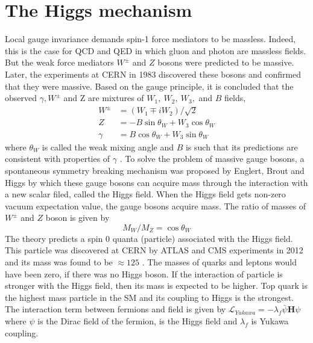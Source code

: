 \section{The Higgs mechanism}\label{sec:higgsMech}
Local gauge invariance demands spin-1 force mediators to be massless. Indeed, this is the case for QCD and QED in which gluon and photon 
are massless fields. But the weak force mediators $W^\pm$ and $Z$ bosons were predicted to be massive. Later, the experiments at CERN in 1983 
\cite{ARNISON1983103}\cite{BANNER1983476}\cite{1983398}\cite{BAGNAIA1983130} discovered these bosons and confirmed that they were massive. 
Based on the gauge principle, it is concluded that the observed $\gamma, W^\pm$ and Z are mixtures of $W_1,\ W_2,\ W_3,$ and $B$ fields,
\begin{align}
W^\pm & = (W_1 \mp iW_2)/\sqrt{2}\\
Z & = -B\sin\theta_W + W_3\cos\theta_W\\
\gamma &= B\cos\theta_W + W_3\sin\theta_W
\end{align}
where $\theta_W$ is called the weak mixing angle and $B$ is such that its predictions are consistent with properties of $\gamma$ 
\cite{MartinShaw}. To solve the problem of massive gauge bosons, a spontaneous symmetry breaking mechanism was proposed by Englert, Brout 
and Higgs \cite{Higgs:1964pj}\cite{Englert:1964et} by which these gauge bosons can acquire mass through the interaction with a new scalar 
filed, called the Higgs field. When the Higgs field gets non-zero vacuum expectation value, the gauge bosons acquire mass.
The ratio of masses of $W^\pm$ and $Z$ boson is given by
\begin{equation}
M_W/M_Z = \cos \theta_W
\end{equation}
The theory predicts a spin 0 quanta (particle) associated with the Higgs field. This particle was discovered at CERN by ATLAS and CMS 
experiments in 2012 \cite{Aad:2012tfa}\cite{Chatrchyan:2012xdj} and its mass was found to be $\approx 125$ \gev. The masses of quarks and 
leptons would have been zero, if there was no Higgs boson. If the interaction of particle is stronger with the Higgs field, then its mass is 
expected to be higher. Top quark is the highest mass particle in the SM and its coupling to Higgs is the strongest. The interaction term between 
fermions and \higgs field is given by $\mathcal{L}_{Yukawa} = - \lambda_f \bar{\psi}\textbf{H}\psi$ where $\psi$ is the Dirac field of the 
fermion, \textbf{\higgs} is the Higgs field and $\lambda_f$ is Yukawa coupling.

